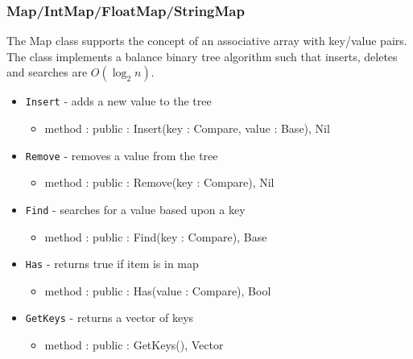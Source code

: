 \documentclass[12pt]{article}
\begin{document}
\subsubsection{Map/IntMap/FloatMap/StringMap}
The Map class supports the concept of an associative array with key/value pairs.  The class implements a balance binary tree algorithm such that inserts, deletes and searches are $O(\log_2 n)$.
\begin{itemize}
    \item \texttt{Insert} - adds a new value to the tree
    	\begin{itemize}
	\item method : public : Insert(key : Compare, value : Base), Nil
	\end{itemize}
    \item \texttt{Remove} - removes a value from the tree
    	\begin{itemize}
	\item method : public : Remove(key : Compare), Nil
	\end{itemize}
    \item \texttt{Find} - searches for a value based upon a key
    	\begin{itemize}
	\item method : public : Find(key : Compare), Base
	\end{itemize}
    \item \texttt{Has} - returns true if item is in map
    	\begin{itemize}
	\item method : public : Has(value : Compare), Bool
	\end{itemize}
    \item \texttt{GetKeys} - returns a vector of keys
    	\begin{itemize}
	\item method : public : GetKeys(), Vector
	\end{itemize}
\end{itemize}
\end{document}
